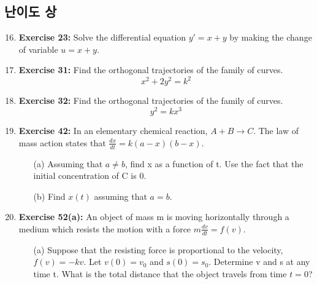 \documentclass[12pt, a4paper]{article}
\begin{document}
\hrulefill
\vspace{1em}

\subsection*{난이도 상}
\begin{enumerate}
    \setcounter{enumi}{15} %
    \item \textbf{Exercise 23:} Solve the differential equation $y' = x+y$ by making the change of variable $u=x+y$.

    \item \textbf{Exercise 31:} Find the orthogonal trajectories of the family of curves.
    \[ x^2 + 2y^2 = k^2 \]

    \item \textbf{Exercise 32:} Find the orthogonal trajectories of the family of curves.
    \[ y^2 = kx^3 \]

    \item \textbf{Exercise 42:} In an elementary chemical reaction, $A+B \rightarrow C$. The law of mass action states that $\frac{dx}{dt} = k(a-x)(b-x)$.
    \begin{itemize}
        \item[(a)] Assuming that $a \neq b$, find x as a function of t. Use the fact that the initial concentration of C is 0.
        \item[(b)] Find $x(t)$ assuming that $a=b$.
    \end{itemize}

    \item \textbf{Exercise 52(a):} An object of mass m is moving horizontally through a medium which resists the motion with a force $m\frac{dv}{dt}=f(v)$.
    \begin{itemize}
        \item[(a)] Suppose that the resisting force is proportional to the velocity, $f(v)=-kv$. Let $v(0)=v_0$ and $s(0)=s_0$. Determine v and s at any time t. What is the total distance that the object travels from time $t=0$?
    \end{itemize}
\end{enumerate}
\end{document}
